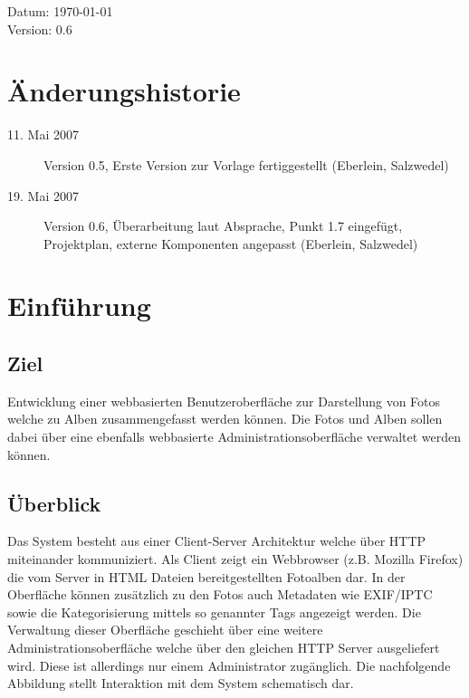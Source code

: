 \documentclass[a4paper,12pt,liststotocnumbered]{scrartcl}
\begin{document}
\begin{center}
	Datum: \today\\
	Version: 0.6
\end{center}

\newpage

\section*{Änderungshistorie}
\begin{description}
	\item[11. Mai 2007] Version 0.5, Erste Version zur Vorlage
		fertiggestellt (Eberlein, Salzwedel)
	\item[19. Mai 2007] Version 0.6, Überarbeitung laut Absprache, Punkt
		1.7 eingefügt, Projektplan, externe Komponenten angepasst
		(Eberlein, Salzwedel)
\end{description}
\newpage

\tableofcontents

\newpage

\section{Einführung}
\subsection{Ziel}

Entwicklung einer webbasierten Benutzeroberfläche zur Darstellung von Fotos
welche zu Alben zusammengefasst werden können. Die Fotos und Alben sollen
dabei über eine ebenfalls webbasierte Administrationsoberfläche verwaltet
werden können.

\subsection{Überblick}

Das System besteht aus einer Client-Server Architektur welche über HTTP
miteinander kommuniziert. Als Client zeigt ein Webbrowser (z.B. Mozilla
Firefox) die vom Server in HTML Dateien bereitgestellten Fotoalben dar. In der
Oberfläche können zusätzlich zu den Fotos auch Metadaten wie EXIF/IPTC sowie
die Kategorisierung mittels so genannter Tags angezeigt werden. Die Verwaltung
dieser Oberfläche geschieht über eine weitere Administrationsoberfläche welche
über den gleichen HTTP Server ausgeliefert wird. Diese ist allerdings nur
einem Administrator zugänglich. Die nachfolgende Abbildung stellt Interaktion
mit dem System schematisch dar.
\end{document}
